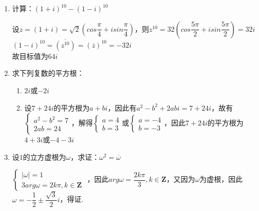 \begin{enumerate}
    \item 计算：$(1+i)^{10}-(1-i)^{10}$
    \begin{jieda}
        设$z=(1+i) = \sqrt{2}\left(cos\dfrac{\pi}{4}+isin\dfrac{\pi}{4}\right)$，则$z^{10}=32\left(cos\dfrac{5\pi}{2}+isin\dfrac{5\pi}{2}\right) = 32i$ \\
        $(1-i)^{10} = \overline{(z^{10})} = (\overline{z})^{10} = -32i$ \\
        故目标值为$64i$
    \end{jieda}
    \item 求下列复数的平方根：
    \begin{jieda}
        \begin{enumerate}
            \item $2i$或$-2i$
            \item 设$7+24i$的平方根为$a+bi$，因此有$a^2-b^2 + 2abi = 7+24i$，故有$\left \{ \begin{array}{l}
                 a^2-b^2 = 7 \\
                 2ab = 24
            \end{array} \right. $，解得$\left \{ \begin{array}{l}
                 a = 4 \\
                 b = 3
            \end{array} \right. $或$\left \{ \begin{array}{l}
                 a = -4 \\
                 b = -3
            \end{array} \right. $，因此$7+24i$的平方根为$4+3i$或$-4-3i$
        \end{enumerate}
    \end{jieda}
    \item 设$1$的立方虚根为$\omega$，求证：$\omega^2 = \overline{\omega}$
    \begin{jieda}
        $\left\{ \begin{array}{l}
             |\omega| = 1  \\
             3arg \omega = 2k\pi, k \in \mathbf{Z}
        \end{array} \right. $
        ，因此$arg \omega = \dfrac{2k\pi}{3}, k \in \mathbf{Z}$，又因为$\omega$为虚根，因此$\omega = -\dfrac{1}{2} \pm \dfrac{\sqrt{3}}{2}i$，得证.

\end{jieda}
\end{enumerate}
